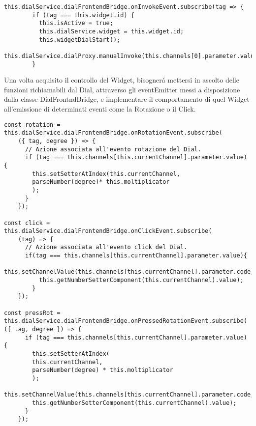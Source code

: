 \vspace{1.0cm}
\begin{lstlisting}[caption={Ascolto Invoke della voce di menu'},style=javaScriptCode]
  this.dialService.dialFrontendBridge.onInvokeEvent.subscribe(tag => {
        if (tag === this.widget.id) {
          this.isActive = true;
          this.dialService.widget = this.widget.id;
          this.widgetDialStart();
          this.dialService.dialProxy.manualInvoke(this.channels[0].parameter.value);
        }
\end{lstlisting} 
\vspace{1.0cm}

Una volta acquisito il controllo del Widget, bisognerá mettersi in ascolto delle funzioni richiamabili dal Dial, attraverso gli eventEmitter messi a disposizione dalla classe DialFrontndBridge, e implementare il comportamento di quel Widget all’emissione di determinati eventi come la Rotazione o il Click.


\vspace{1.0cm}
\begin{lstlisting}[caption={Ascolto eventi associati alla voce di menu' selezionata},style=javaScriptCode]
const rotation = this.dialService.dialFrontendBridge.onRotationEvent.subscribe(
	({ tag, degree }) => {
      // Azione associata all'evento rotazione del Dial.
      if (tag === this.channels[this.currentChannel].parameter.value) {
        this.setSetterAtIndex(this.currentChannel, 
        parseNumber(degree)* this.moltiplicator
        );
      }
    });

const click = this.dialService.dialFrontendBridge.onClickEvent.subscribe(
	(tag) => {
      // Azione associata all'evento click del Dial.
      if(tag === this.channels[this.currentChannel].parameter.value){
          this.setChannelValue(this.channels[this.currentChannel].parameter.code,
          this.getNumberSetterComponent(this.currentChannel).value);
        }
    });

const pressRot = this.dialService.dialFrontendBridge.onPressedRotationEvent.subscribe(
({ tag, degree }) => {
      if (tag === this.channels[this.currentChannel].parameter.value) {
        this.setSetterAtIndex(
        this.currentChannel, 
        parseNumber(degree) * this.moltiplicator
        );
        this.setChannelValue(this.channels[this.currentChannel].parameter.code,
        this.getNumberSetterComponent(this.currentChannel).value);
      }
    });
\end{lstlisting} 
\vspace{1.0cm}

